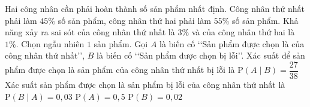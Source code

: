 \cauds
\begin{ex}%
Hai công nhân cần phải hoàn thành số sản phẩm nhất định. Công nhân thứ nhất phải làm $45\%$ số sản phẩm, công nhân thứ hai phải làm $55\%$ số sản phẩm. Khả năng xảy ra sai sót của công nhân thứ nhất là $3\%$ và của công nhân thứ hai là $1\%$. Chọn ngẫu nhiên $1$ sản phẩm. Gọi $A$ là biến cố \lq\lq Sản phẩm được chọn là của công nhân thứ nhất\rq\rq, $B$ là biến cố \lq\lq Sản phẩm được chọn bị lỗi\rq\rq.
\choiceTF
{\True Xác suất để sản phẩm được chọn là sản phẩm của công nhân thứ nhất bị lỗi là $\mathrm{P}\left(A\mid B\right)=\dfrac{27}{38}$}
{\True Xác suất sản phẩm được chọn là sản phẩm bị lỗi của công nhân thứ nhất là $\mathrm{P}\left(B\mid A\right)=0{,}03$}
{$\mathrm{P}(A)=0{,}5$}
{$\mathrm{P}(B)=0{,}02$}
\end{ex}


